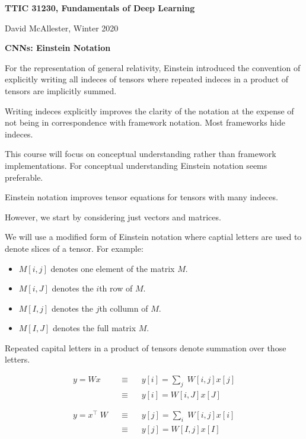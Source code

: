 




{\Huge
  
  \centerline{\bf TTIC 31230, Fundamentals of Deep Learning}
  \bigskip
  \centerline{David McAllester, Winter 2020}
  \vfill
  \vfill
  \centerline{\bf CNNs: Einstein Notation}
  \vfill
  \vfill
  \vfill



For the representation of general relativity, Einstein introduced the convention of explicitly writing all indeces of tensors where repeated indeces in a product of tensors are implicitly summed.

\vfill
Writing indeces explicitly improves the clarity of the notation at the expense of not being in correspondence with framework notation.  Most frameworks hide indeces.

\vfill
This course will focus on conceptual understanding rather than framework implementations.  For conceptual understanding Einstein notation seems preferable.



Einstein notation improves tensor equations for tensors with many indeces.

\vfill
However, we start by considering just vectors and matrices.

\vfill
We will use a modified form of Einstein notation where captial letters are used to denote slices of a tensor.  For example:

\vfill
\begin{itemize}
\item $M[i,j]$ denotes one element of the matrix $M$.
\item $M[i,J]$ denotes the $i$th row of $M$.
\item $M[I,j]$ denotes the $j$th collumn of $M$.
\item $M[I,J]$ denotes the full matrix $M$.
\end{itemize}

Repeated capital letters in a product of tensors denote summation over those letters.

\vfill
\begin{eqnarray*}
y = Wx &\;\;\;\equiv\;\;\; & y[i] = \sum_j \;W[i,j]x[j] \\
& \;\;\;\equiv \;\;\; & y[i] = W[i,J]x[J] \\
\\
\\
y = x^\top\;W & \;\;\;\equiv \;\;\; & y[j] = \sum_i \;W[i,j]x[i] \\
& \;\;\;\equiv \;\;\; & y[j] = W[I,j]x[I]
\end{eqnarray*}

}
